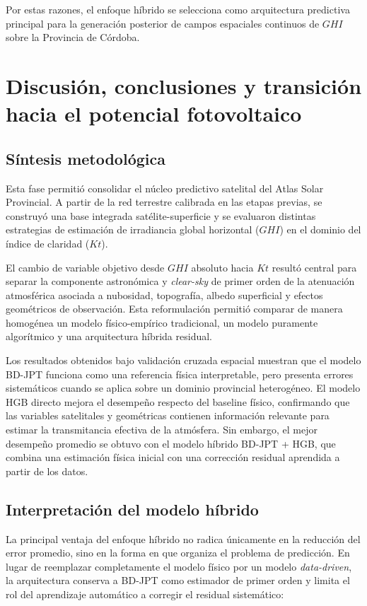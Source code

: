 \documentclass[../main.tex]{subfiles}
\begin{document}
Por estas razones, el enfoque híbrido se selecciona como arquitectura predictiva principal para la generación posterior de campos espaciales continuos de $GHI$ sobre la Provincia de Córdoba.



\section{Discusión, conclusiones y transición hacia el potencial fotovoltaico}

\subsection{Síntesis metodológica}

Esta fase permitió consolidar el núcleo predictivo satelital del Atlas Solar Provincial. A partir de la red terrestre calibrada en las etapas previas, se construyó una base integrada satélite-superficie y se evaluaron distintas estrategias de estimación de irradiancia global horizontal ($GHI$) en el dominio del índice de claridad ($Kt$).

El cambio de variable objetivo desde $GHI$ absoluto hacia $Kt$ resultó central para separar la componente astronómica y \textit{clear-sky} de primer orden de la atenuación atmosférica asociada a nubosidad, topografía, albedo superficial y efectos geométricos de observación. Esta reformulación permitió comparar de manera homogénea un modelo físico-empírico tradicional, un modelo puramente algorítmico y una arquitectura híbrida residual.

Los resultados obtenidos bajo validación cruzada espacial muestran que el modelo BD-JPT funciona como una referencia física interpretable, pero presenta errores sistemáticos cuando se aplica sobre un dominio provincial heterogéneo. El modelo HGB directo mejora el desempeño respecto del baseline físico, confirmando que las variables satelitales y geométricas contienen información relevante para estimar la transmitancia efectiva de la atmósfera. Sin embargo, el mejor desempeño promedio se obtuvo con el modelo híbrido BD-JPT + HGB, que combina una estimación física inicial con una corrección residual aprendida a partir de los datos.

\subsection{Interpretación del modelo híbrido}

La principal ventaja del enfoque híbrido no radica únicamente en la reducción del error promedio, sino en la forma en que organiza el problema de predicción. En lugar de reemplazar completamente el modelo físico por un modelo \textit{data-driven}, la arquitectura conserva a BD-JPT como estimador de primer orden y limita el rol del aprendizaje automático a corregir el residual sistemático:
\end{document}
